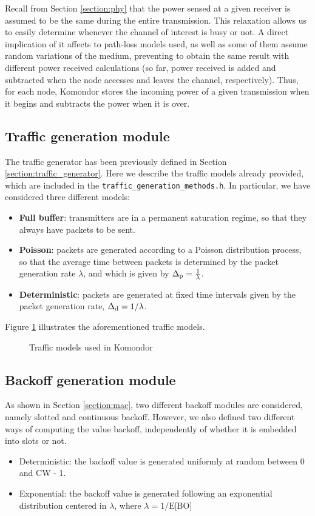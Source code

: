 \documentclass[a4paper]{article}
\begin{document}
Recall from Section \ref{section:phy} that the power sensed at a given receiver is assumed to be the same during the entire transmission. This relaxation allows us to easily determine whenever the channel of interest is busy or not. A direct implication of it affects to path-loss models used, as well as some of them assume random variations of the medium, preventing to obtain the same result with different power received calculations (so far, power received is added and subtracted when the node accesses and leaves the channel, respectively). Thus, for each node, Komondor stores the incoming power of a given transmission when it begins and subtracts the power when it is over. 

\subsection{Traffic generation module}
\label{section:traffic_modelling}
The traffic generator has been previously defined in Section \ref{section:traffic_generator}. Here we describe the traffic models already provided, which are included in the \texttt{traffic\_generation\_methods.h}. In particular, we have considered three different models:
\begin{itemize}
	\item \textbf{Full buffer}: transmitters are in a permanent saturation regime, so that they always have packets to be sent.
	\item \textbf{Poisson}: packets are generated according to a Poisson distribution process, so that the average time between packets is determined by the packet generation rate $\lambda$, and which is given by $\Delta_{\rm p} = \frac{1}{\lambda}$.
	\item \textbf{Deterministic}: packets are generated at fixed time intervals given by the packet generation rate, $\Delta_{\rm d} = 1/\lambda$.
\end{itemize}

Figure \ref{fig:traffic_models} illustrates the aforementioned traffic models. 
\begin{figure}[h!]
	\centering
	\caption{Traffic models used in Komondor}
	\label{fig:traffic_models}
\end{figure}	

\subsection{Backoff generation module}
As shown in Section \ref{section:mac}, two different backoff modules are considered, namely slotted and continuous backoff. However, we also defined two different ways of computing the value backoff, independently of whether it is embedded into slots or not.
\begin{itemize}
	\item Deterministic: the backoff value is generated uniformly at random between 0 and CW - 1.
	\item Exponential: the backoff value is generated following an exponential distribution centered in $\lambda$, where $\lambda = 1/\text{E[BO]}$
\end{itemize}
\end{document}
